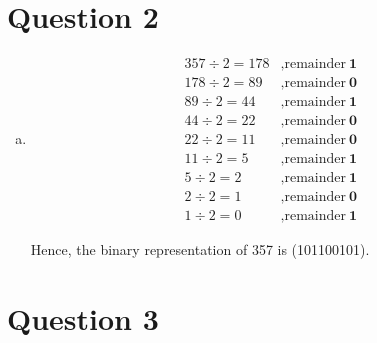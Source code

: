 \documentclass[12pt]{article}
\begin{document}
\section*{Question 2}
\begin{enumerate}[a.]
    \item

    \begin{align*}
        357 \div 2 = 178 &, \text{remainder}\:\textbf{1}\\
        178 \div 2 = 89 &, \text{remainder}\:\textbf{0}\\
        89 \div 2 = 44 &, \text{remainder}\:\textbf{1}\\
        44 \div 2 = 22 &, \text{remainder}\:\textbf{0}\\
        22 \div 2 = 11 &, \text{remainder}\:\textbf{0}\\
        11 \div 2 = 5 &, \text{remainder}\:\textbf{1}\\
        5 \div 2 = 2 &, \text{remainder}\:\textbf{1}\\
        2 \div 2 = 1 &, \text{remainder}\:\textbf{0}\\
        1 \div 2 = 0 &, \text{remainder}\:\textbf{1}
    \end{align*}

    Hence, the binary representation of 357 is (101100101).
\end{enumerate}

\section*{Question 3}
\end{document}
